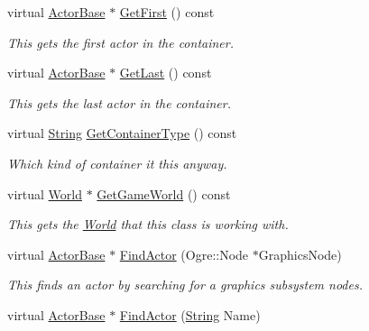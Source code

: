 \begin{DoxyCompactItemize}
virtual \hyperlink{classphys_1_1ActorBase}{ActorBase} $\ast$ \hyperlink{classphys_1_1ActorContainerVector_a55ceecd017455f3185aa62798811e3c6}{GetFirst} () const 
\begin{DoxyCompactList}\small\item\em This gets the first actor in the container. \item\end{DoxyCompactList}\item 
virtual \hyperlink{classphys_1_1ActorBase}{ActorBase} $\ast$ \hyperlink{classphys_1_1ActorContainerVector_a211f6e419ef0b753cecf2c662a54511e}{GetLast} () const 
\begin{DoxyCompactList}\small\item\em This gets the last actor in the container. \item\end{DoxyCompactList}\item 
virtual \hyperlink{namespacephys_aa03900411993de7fbfec4789bc1d392e}{String} \hyperlink{classphys_1_1ActorContainerVector_ae18c29b30d840e0f4fc9b553dd5ca32c}{GetContainerType} () const 
\begin{DoxyCompactList}\small\item\em Which kind of container it this anyway. \item\end{DoxyCompactList}\item 
virtual \hyperlink{classphys_1_1World}{World} $\ast$ \hyperlink{classphys_1_1ActorContainerVector_a5519eb0000073a2f397e158bfc368349}{GetGameWorld} () const 
\begin{DoxyCompactList}\small\item\em This gets the \hyperlink{classphys_1_1World}{World} that this class is working with. \item\end{DoxyCompactList}\item 
virtual \hyperlink{classphys_1_1ActorBase}{ActorBase} $\ast$ \hyperlink{classphys_1_1ActorContainerVector_ad01cf1452bda36cee175ae0e54d509cc}{FindActor} (Ogre::Node $\ast$GraphicsNode)
\begin{DoxyCompactList}\small\item\em This finds an actor by searching for a graphics subsystem nodes. \item\end{DoxyCompactList}\item 
virtual \hyperlink{classphys_1_1ActorBase}{ActorBase} $\ast$ \hyperlink{classphys_1_1ActorContainerVector_ae04f8c6dd9b07ef9c1456707be9e155b}{FindActor} (\hyperlink{namespacephys_aa03900411993de7fbfec4789bc1d392e}{String} Name)

\end{DoxyCompactItemize}

